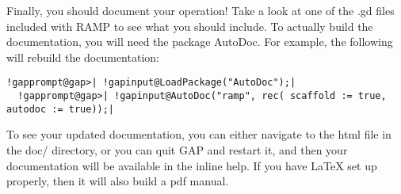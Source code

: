 \documentclass[a4paper,11pt]{report}
\begin{document}
{{ Finally, you should document your operation! Take a look at one of the .gd
files included with RAMP to see what you should include. To actually build the
documentation, you will need the package AutoDoc. For example, the following
will rebuild the documentation: 
\begin{Verbatim}[commandchars=!@|,fontsize=\small,frame=single,label=Example]
  !gapprompt@gap>| !gapinput@LoadPackage("AutoDoc");|
  !gapprompt@gap>| !gapinput@AutoDoc("ramp", rec( scaffold := true, autodoc := true));|
\end{Verbatim}
 To see your updated documentation, you can either navigate to the html file in
the doc/ directory, or you can quit GAP and restart it, and then your
documentation will be available in the inline help. If you have LaTeX set up
properly, then it will also build a pdf manual. 

 }

 }

   
\end{document}
